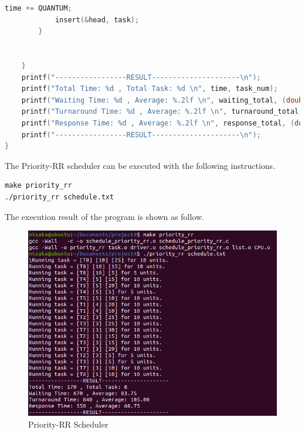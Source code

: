 \documentclass[UTF8,10pt,a4paper]{article}
\theoremstyle{Problem}
\theoremstyle{Solution}
\begin{document}
\begin{lstlisting}[language = c]
			time += QUANTUM;
			insert(&head, task);
		}

		
	}
	printf("-----------------RESULT---------------------\n");
	printf("Total Time: %d , Total Task: %d \n", time, task_num);
	printf("Waiting Time: %d , Average: %.2lf \n", waiting_total, (double)waiting_total / task_num);
	printf("Turnaround Time: %d , Average: %.2lf \n", turnaround_total, (double)turnaround_total / task_num);
	printf("Response Time: %d , Average: %.2lf \n", response_total, (double)response_total / task_num);
	printf("-----------------RESULT---------------------\n");
}
\end{lstlisting}

The Priority-RR scheduler can be executed with the following instructions.
\begin{lstlisting}
make priority_rr
./priority_rr schedule.txt
\end{lstlisting}

The execution result of the program is shown as follow.

\begin{figure}[H]
    \centering
    \includegraphics[width=400pt]{5prirr.png}
    \caption{Priority-RR Scheduler}
    \label{3}
\end{figure}
\end{document}
